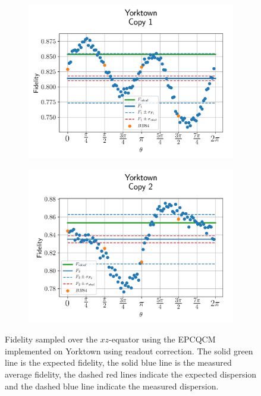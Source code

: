 \begin{figure}[H]
  \centering
  \begin{subfigure}{.5\textwidth}
    \centering
    \includegraphics[width=\textwidth]{Figures/Economical/IBM/OnlyEquator/results_corrected_ibmqx2_copy1.png}
    \label{fig:epc_corrected_yorktown_equator_1}
  \end{subfigure}%
  \begin{subfigure}{.5\textwidth}
    \centering
    \includegraphics[width=\textwidth]{Figures/Economical/IBM/OnlyEquator/results_corrected_ibmqx2_copy2.png}
    \label{fig:epc_corrected_yorktown_equator_2}
  \end{subfigure}
  \vspace{-0.5cm}
  \caption{Fidelity sampled over the $xz$-equator using the EPCQCM implemented on Yorktown using readout correction. The solid green line is the expected fidelity, the solid blue line is the measured average fidelity, the dashed red lines indicate the expected dispersion and the dashed blue line indicate the measured dispersion.}
  \label{fig:epc_corrected_yorktown_equator}
\end{figure}

